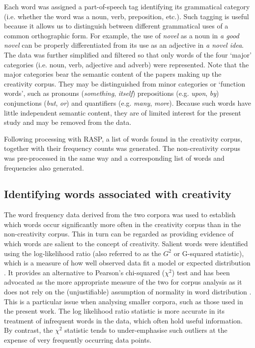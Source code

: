 \documentclass[10pt,letterpaper]{article}
\begin{document}
Each word was assigned a part-of-speech tag identifying its grammatical category (i.e. whether the word was a noun, verb, preposition, etc.). Such tagging is useful because it allows us to distinguish between different grammatical uses of a common orthographic form. For example, the use of {\em novel\/} as a noun in {\em a good novel\/} can be properly differentiated from its use as an adjective in {\em a novel idea\/}.  The data was further simplified and filtered so that only words of the four `major' categories (i.e. noun, verb, adjective and adverb) were represented. Note that the major categories bear the semantic content of the papers making up the creativity corpus. They may be distinguished from minor categories or `function words', such as pronouns ({\em something\/}, {\em itself\/}) prepositions (e.g. {\em upon\/}, {\em by\/}) conjunctions ({\em but\/}, {\em or\/}) and quantifiers (e.g. {\em many\/}, {\em more\/}). Because such words have little independent semantic content, they are of limited interest for the present study and may be removed from the data.  

Following processing with RASP, a list of words found in the creativity corpus, together with their frequency counts was generated. The non-creativity corpus was pre-processed in the same way and a corresponding list of words and frequencies also generated. 


\subsection*{Identifying words associated with creativity}

The word frequency data derived from the two corpora was used to establish which words occur significantly more often in the creativity corpus than in the non-creativity corpus. This in turn can be regarded as providing evidence of which words are salient to the concept of creativity. Salient words were identified using the log-likelihood ratio  (also referred to as the $G^2$ or G-squared statistic), which is a measure of how well observed data fit a model or expected distribution \cite{dunning93,kilgarriff01,rayson00,oakes98}. It provides an alternative to Pearson's chi-squared ($\chi^2$) test and has been advocated as the more appropriate measure of the two for corpus analysis as it does not rely on the (unjustifiable) assumption of normality in word distribution  \cite{dunning93,kilgarriff01,oakes98}. This is a particular issue when analysing smaller corpora, such as those used in the present work. 
The log likelihood ratio statistic is more accurate in its treatment of infrequent words in the data,  which often hold useful information. By contrast, the $\chi^2$ statistic tends to under-emphasise such outliers at the expense of very frequently occurring data points.
\end{document}
